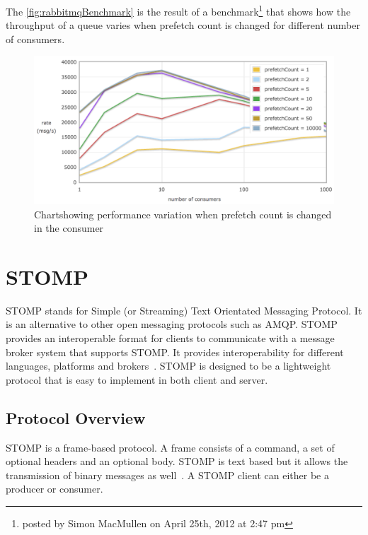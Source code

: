   The \autoref{fig:rabbitmqBenchmark} is the result of a benchmark\footnote{posted by Simon MacMullen on April 25th, 2012 at 2:47 pm} that shows how the throughput of a queue varies when prefetch count is changed for different number of consumers.
\begin{figure}[H]
  \centering
  \includegraphics[width=1\textwidth]{figures/rabbitmqPrefetch}
  \caption[Chart showing performance variation when prefetch count is changed in the consumer]{Chart\footnotemark showing performance variation when prefetch count is changed in the consumer}
  \label{fig:rabbitmqBenchmark}
\end{figure}

\section{STOMP}
\label{sec:stomp}
  STOMP stands for Simple (or Streaming) Text Orientated Messaging Protocol. It is an alternative to other open messaging protocols such as AMQP. STOMP provides an interoperable format for clients to communicate with a message broker system that supports STOMP. It provides interoperability for different languages, platforms and brokers~\cite{stomp}.
  STOMP is designed to be a lightweight protocol that is easy to implement in both client and server.
  \subsection{Protocol Overview}
  STOMP is a frame-based protocol. A frame consists of a command, a set of optional headers and an optional body. STOMP is text based but it allows the transmission of binary messages as well~\cite{stomp}. A STOMP client can either be a producer or consumer.

